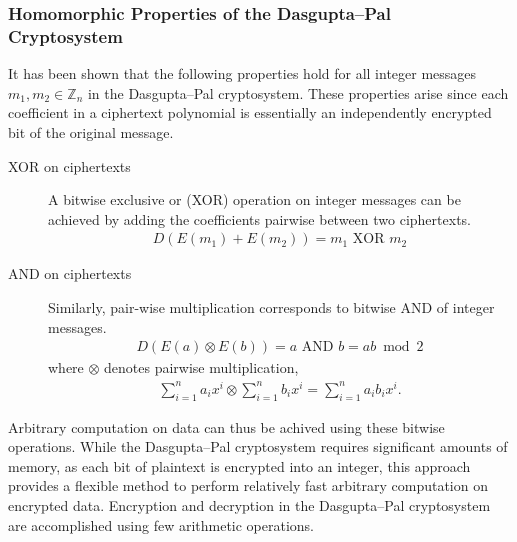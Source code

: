 \subsubsection{Homomorphic Properties of the Dasgupta--Pal Cryptosystem}
It has been shown \cite{dasgupta_design_2016} that the following properties hold for all integer messages $m_1, m_2 \in \mathbb{Z}_n$ in the Dasgupta--Pal cryptosystem. These properties arise since each coefficient in a ciphertext polynomial is essentially an independently encrypted bit of the original message.
\begin{description}
	\item[XOR on ciphertexts]
	A bitwise exclusive or (XOR) operation on integer messages can be achieved by adding the coefficients pairwise between two ciphertexts.
	\begin{align*}
		D(E(m_1)+E(m_2)) = m_1 \text{ XOR } m_2
	\end{align*}
	\item[AND on ciphertexts]
	Similarly, pair-wise multiplication corresponds to bitwise AND of integer messages.
	\begin{align*}
		D(E(a) \otimes E(b)) = a \text{ AND } b = ab \bmod 2
	\end{align*}
	where $\otimes$ denotes pairwise multiplication,
	\begin{align*}
		\sum_{i=1}^n{a_ix^i} \otimes \sum_{i=1}^n{b_ix^i} = \sum_{i=1}^n{a_ib_ix^i}.
	\end{align*}
\end{description}

Arbitrary computation on data can thus be achived using these bitwise operations. While the Dasgupta--Pal cryptosystem requires significant amounts of memory, as each bit of plaintext is encrypted into an integer, this approach provides a flexible method to perform relatively fast arbitrary computation on encrypted data. Encryption and decryption in the Dasgupta--Pal cryptosystem are accomplished using few arithmetic operations.
